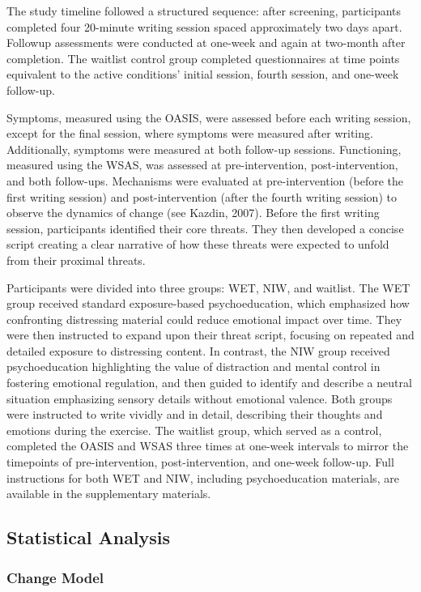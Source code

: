\documentclass[
  man,floatsintext]{apa7}
\begin{document}
The study timeline followed a structured sequence: after screening, participants completed four 20-minute writing session spaced approximately two days apart.
Followup assessments were conducted at one-week and again at two-month after completion.
The waitlist control group completed questionnaires at time points equivalent to the active conditions' initial session, fourth session, and one-week follow-up.

Symptoms, measured using the OASIS, were assessed before each writing session, except for the final session, where symptoms were measured after writing.
Additionally, symptoms were measured at both follow-up sessions.
Functioning, measured using the WSAS, was assessed at pre-intervention, post-intervention, and both follow-ups.
Mechanisms were evaluated at pre-intervention (before the first writing session) and post-intervention (after the fourth writing session) to observe the dynamics of change (see Kazdin, 2007).
Before the first writing session, participants identified their core threats.
They then developed a concise script creating a clear narrative of how these threats were expected to unfold from their proximal threats.

Participants were divided into three groups: WET, NIW, and waitlist.
The WET group received standard exposure-based psychoeducation, which emphasized how confronting distressing material could reduce emotional impact over time.
They were then instructed to expand upon their threat script, focusing on repeated and detailed exposure to distressing content.
In contrast, the NIW group received psychoeducation highlighting the value of distraction and mental control in fostering emotional regulation,
and then guided to identify and describe a neutral situation emphasizing sensory details without emotional valence.
Both groups were instructed to write vividly and in detail, describing their thoughts and emotions during the exercise.
The waitlist group, which served as a control, completed the OASIS and WSAS three times at one-week intervals to mirror the timepoints of pre-intervention, post-intervention, and one-week follow-up.
Full instructions for both WET and NIW, including psychoeducation materials, are available in the supplementary materials.

\subsection{Statistical Analysis}\label{statistical-analysis}

\subsubsection{Change Model}\label{change-model}
\end{document}
